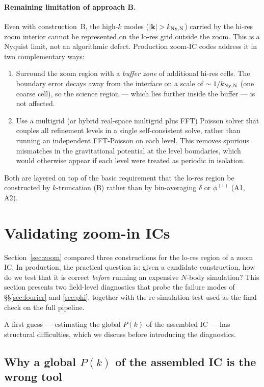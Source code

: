 \documentclass[12pt]{article}
\begin{document}
\paragraph{Remaining limitation of approach B.}
Even with construction~B, the high-$k$ modes ($|\mathbf k|>k_{\rm Ny,N}$)
carried by the hi-res zoom interior cannot be represented on the lo-res
grid outside the zoom. This is a Nyquist limit, not an algorithmic
defect. Production zoom-IC codes address it in two complementary ways:
\begin{enumerate}
\item Surround the zoom region with a \emph{buffer zone} of additional
      hi-res cells. The boundary error decays away from the interface
      on a scale of $\sim 1/k_{\rm Ny,N}$ (one coarse cell), so the
      science region --- which lies further inside the buffer --- is
      not affected.
\item Use a multigrid (or hybrid real-space multigrid plus FFT)
      Poisson solver that couples all refinement levels in a single
      self-consistent solve, rather than running an independent
      FFT-Poisson on each level. This removes spurious mismatches in
      the gravitational potential at the level boundaries, which would
      otherwise appear if each level were treated as periodic in
      isolation.
\end{enumerate}
Both are layered on top of the basic requirement that the lo-res region
be constructed by $k$-truncation (B) rather than by bin-averaging
$\delta$ or $\phi^{(1)}$ (A1, A2).

\section{Validating zoom-in ICs}\label{sec:zoom-validation}

Section~\ref{sec:zoom} compared three constructions for the lo-res
region of a zoom IC. In production, the practical question is: given a
candidate construction, how do we test that it is correct
\emph{before} running an expensive $N$-body simulation? This section
presents two field-level diagnostics that probe the failure modes of
\S\S\ref{sec:fourier} and \ref{sec:phi}, together with the
re-simulation test used as the final check on the full pipeline.

A first guess --- estimating the global $P(k)$ of the assembled IC ---
has structural difficulties, which we discuss before introducing the
diagnostics.

\subsection{Why a global $P(k)$ of the assembled IC is the wrong tool}\label{sec:val-why-not-pk}
\end{document}
